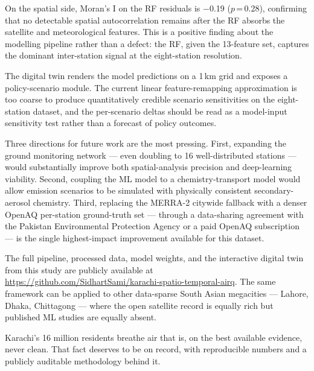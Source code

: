 \documentclass{iopjournal}
\begin{document}
On the spatial side, Moran's I on the RF residuals is $-$0.19
($p$\,=\,0.28), confirming that no detectable spatial
autocorrelation remains after the RF absorbs the satellite and
meteorological features. This is a positive finding about the
modelling pipeline rather than a defect: the RF, given the
13-feature set, captures the dominant inter-station signal at
the eight-station resolution.

The digital twin renders the model predictions on a 1\,km grid
and exposes a policy-scenario module. The current linear
feature-remapping approximation is too coarse to produce
quantitatively credible scenario sensitivities on the
eight-station dataset, and the per-scenario deltas should be
read as a model-input sensitivity test rather than a forecast
of policy outcomes.

Three directions for future work are the most pressing. First,
expanding the ground monitoring network --- even doubling to 16
well-distributed stations --- would substantially improve both
spatial-analysis precision and deep-learning viability. Second,
coupling the ML model to a chemistry-transport model would
allow emission scenarios to be simulated with physically
consistent secondary-aerosol chemistry. Third, replacing the
MERRA-2 citywide fallback with a denser OpenAQ per-station
ground-truth set --- through a data-sharing agreement with the
Pakistan Environmental Protection Agency or a paid OpenAQ
subscription --- is the single highest-impact improvement
available for this dataset.

The full pipeline, processed data, model weights, and the
interactive digital twin from this study are publicly available
at
\url{https://github.com/SidhartSami/karachi-spatio-temporal-airq}.
The same framework can be applied to other data-sparse South
Asian megacities --- Lahore, Dhaka, Chittagong --- where the
open satellite record is equally rich but published ML studies
are equally absent.

Karachi's 16 million residents breathe air that is, on the best
available evidence, never clean. That fact deserves to be on
record, with reproducible numbers and a publicly auditable
methodology behind it.


\end{document}
